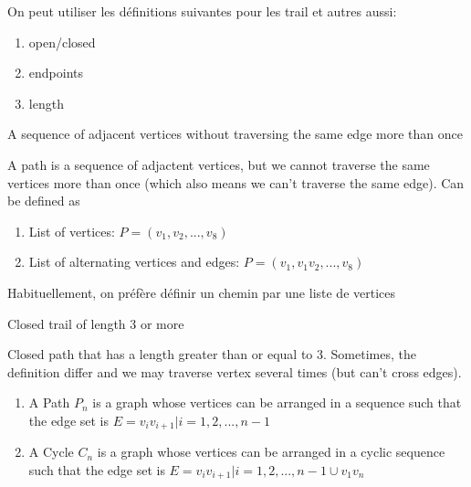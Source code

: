 \documentclass{article}
\begin{document}
\begin{remark}
    On peut utiliser les définitions suivantes pour les trail et autres
    aussi:
    \begin{enumerate}
	\item open/closed
	\item endpoints
	\item length
    \end{enumerate}
\end{remark}

\begin{definition}[Trail]
    A sequence of adjacent vertices without traversing the same edge
    more than once
\end{definition}

\begin{definition}[Path]
    A path is a sequence of adjactent vertices, but we cannot traverse
    the same vertices more than once (which also means we can't
    traverse the same edge). Can be defined as
    \begin{enumerate}
	\item List of vertices: $ P=(v_1, v_2, ..., v_8)$
	\item List of alternating vertices and edges: $ P=(v_1, v_1v_2,
	    ..., v_8) $
    \end{enumerate}
    Habituellement, on préfère définir un chemin par une liste de vertices
\end{definition}

\begin{definition}[Circuit]
    Closed trail of length 3 or more
\end{definition}

\begin{definition}[Cycle]
    Closed path that has a length greater than or equal to 3. Sometimes,
    the definition differ and we may traverse vertex several times (but
    can't cross edges).
\end{definition}

\begin{definition}
    \begin{enumerate}
	\item A Path $P_n$ is a graph whose vertices can be arranged
	    in a sequence such that the edge set is
	    $ E = {v_i v_{i+1} | i = 1,2,...,n-1} $
	\item A Cycle $C_n$ is a graph whose vertices can be arranged in
	    a cyclic sequence such that the edge set is
	    $ E = {v_i v_{i+1} | i = 1,2,...,n-1} \cup{v_1v_n}$
    \end{enumerate}
\end{definition}
\end{document}
